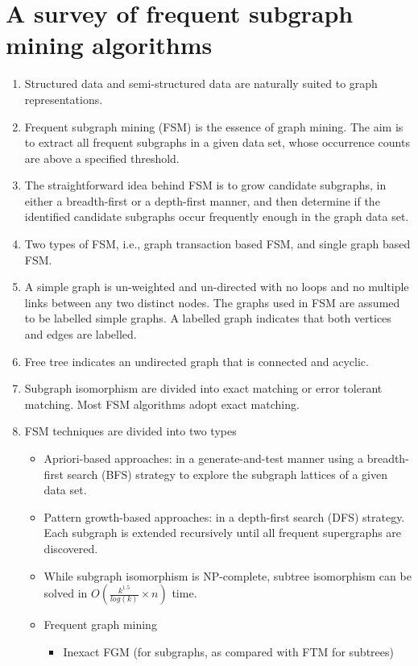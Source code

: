 \documentclass[14pt]{article}
\begin{document}
\section{A survey of frequent subgraph mining algorithms}
\begin{enumerate}
 \item Structured data and semi-structured data are naturally suited to graph representations. 
 \item Frequent subgraph mining (FSM) is the essence of graph mining. The aim is to extract all frequent subgraphs in a given data set, whose occurrence counts are above a specified threshold.
 \item The straightforward idea behind FSM is to grow candidate subgraphs, in either a breadth-first or a depth-first manner, and then determine if the identified candidate subgraphs occur frequently enough in the graph data set.
 \item Two types of FSM, i.e., graph transaction based FSM, and single graph based FSM.
 \item A simple graph is un-weighted and un-directed with no loops and no multiple links between any two distinct nodes. The graphs used in FSM are assumed to be labelled simple graphs. A labelled graph indicates that both vertices and edges are labelled. 
 \item Free tree indicates an undirected graph that is connected and acyclic. 
 \item Subgraph isomorphism are divided into exact matching or error tolerant matching. Most FSM algorithms adopt exact matching. 
 \item FSM techniques are divided into two types
  \begin{itemize}
   \item Apriori-based approaches: in a generate-and-test manner using a breadth-first search (BFS) strategy to explore the subgraph lattices of a given data set.
   \item Pattern growth-based approaches: in a depth-first search (DFS) strategy. Each subgraph is extended recursively until all frequent supergraphs are discovered.
   \item While subgraph isomorphism is NP-complete, subtree isomorphism can be solved in $O(\frac{k^1.5}{log(k)} \times n)$ time. 
   \item Frequent graph mining
    \begin{itemize}
     \item Inexact FGM (for subgraphs, as compared with FTM for subtrees)

\end{itemize}
\end{itemize}
\end{enumerate}
\end{document}

